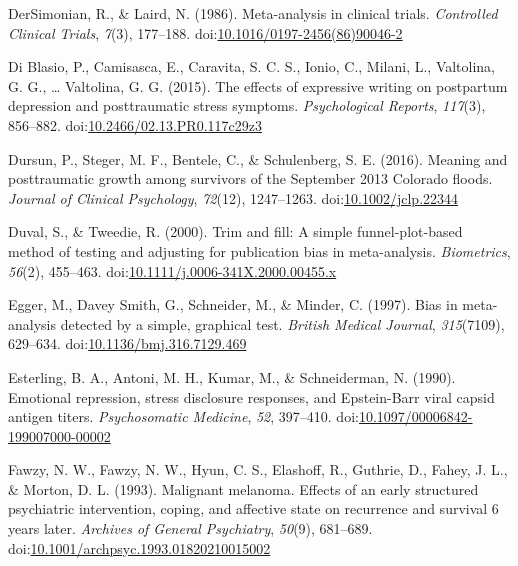 \documentclass[,man]{apa6}
\begin{document}
\leavevmode\hypertarget{ref-DerSimonian1986}{}%
DerSimonian, R., \& Laird, N. (1986). Meta-analysis in clinical trials. \emph{Controlled Clinical Trials}, \emph{7}(3), 177--188. doi:\href{https://doi.org/10.1016/0197-2456(86)90046-2}{10.1016/0197-2456(86)90046-2}

\leavevmode\hypertarget{ref-Blasio2015a}{}%
Di Blasio, P., Camisasca, E., Caravita, S. C. S., Ionio, C., Milani, L., Valtolina, G. G., \ldots{} Valtolina, G. G. (2015). The effects of expressive writing on postpartum depression and posttraumatic stress symptoms. \emph{Psychological Reports}, \emph{117}(3), 856--882. doi:\href{https://doi.org/10.2466/02.13.PR0.117c29z3}{10.2466/02.13.PR0.117c29z3}

\leavevmode\hypertarget{ref-Dursun2016}{}%
Dursun, P., Steger, M. F., Bentele, C., \& Schulenberg, S. E. (2016). Meaning and posttraumatic growth among survivors of the September 2013 Colorado floods. \emph{Journal of Clinical Psychology}, \emph{72}(12), 1247--1263. doi:\href{https://doi.org/10.1002/jclp.22344}{10.1002/jclp.22344}

\leavevmode\hypertarget{ref-Duval2000}{}%
Duval, S., \& Tweedie, R. (2000). Trim and fill: A simple funnel-plot-based method of testing and adjusting for publication bias in meta-analysis. \emph{Biometrics}, \emph{56}(2), 455--463. doi:\href{https://doi.org/10.1111/j.0006-341X.2000.00455.x}{10.1111/j.0006-341X.2000.00455.x}

\leavevmode\hypertarget{ref-Egger1997}{}%
Egger, M., Davey Smith, G., Schneider, M., \& Minder, C. (1997). Bias in meta-analysis detected by a simple, graphical test. \emph{British Medical Journal}, \emph{315}(7109), 629--634. doi:\href{https://doi.org/10.1136/bmj.316.7129.469}{10.1136/bmj.316.7129.469}

\leavevmode\hypertarget{ref-Esterling1990}{}%
Esterling, B. A., Antoni, M. H., Kumar, M., \& Schneiderman, N. (1990). Emotional repression, stress disclosure responses, and Epstein-Barr viral capsid antigen titers. \emph{Psychosomatic Medicine}, \emph{52}, 397--410. doi:\href{https://doi.org/10.1097/00006842-199007000-00002}{10.1097/00006842-199007000-00002}

\leavevmode\hypertarget{ref-Fawzy1993}{}%
Fawzy, N. W., Fawzy, N. W., Hyun, C. S., Elashoff, R., Guthrie, D., Fahey, J. L., \& Morton, D. L. (1993). Malignant melanoma. Effects of an early structured psychiatric intervention, coping, and affective state on recurrence and survival 6 years later. \emph{Archives of General Psychiatry}, \emph{50}(9), 681--689. doi:\href{https://doi.org/10.1001/archpsyc.1993.01820210015002}{10.1001/archpsyc.1993.01820210015002}
\end{document}
